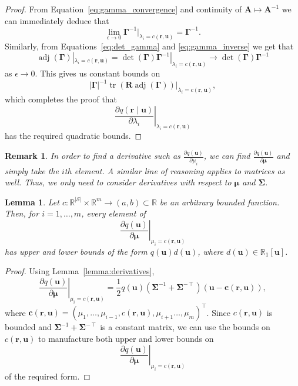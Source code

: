 \documentclass{mpaper}
\newtheorem{lemma}[theorem]{Lemma}
\newtheorem{remark}[theorem]{Remark}
\DeclareMathOperator{\adj}{adj}
\DeclareMathOperator{\tr}{tr}
\begin{document}
\begin{proof}
  From Equation~\eqref{eq:gamma_convergence} and continuity of $\mathbf{A} \mapsto
  \mathbf{A}^{-1}$ we can immediately deduce that
  \begin{equation} \label{eq:gamma_inverse}
    \lim_{\epsilon \to 0} \bm\Gamma^{-1}|_{\lambda_i = c(\mathbf{r},
      \mathbf{u})} = \bm\Gamma^{-1}.
  \end{equation}
  Similarly, from Equations~\eqref{eq:det_gamma} and \eqref{eq:gamma_inverse} we
  get that
  \[
    \adj(\bm\Gamma)|_{\lambda_i = c(\mathbf{r}, \mathbf{u})} =
    \det(\bm\Gamma)\bm\Gamma^{-1}|_{\lambda_i = c(\mathbf{r}, \mathbf{u})} \to
    \det(\bm\Gamma)\bm\Gamma^{-1}
  \]
  as $\epsilon \to 0$. This gives us constant bounds on
  \[
    |\bm\Gamma|^{-1}\tr(\mathbf{R}\adj(\bm\Gamma))|_{\lambda_i = c(\mathbf{r},
      \mathbf{u})},
  \]
  which completes the proof that
  \[
    \left. \frac{\partial q(\mathbf{r} \mid \mathbf{u})}{\partial \lambda_i}
    \right|_{\lambda_i = c(\mathbf{r}, \mathbf{u})}
  \]
  has the required quadratic bounds.
\end{proof}

\begin{remark}
  In order to find a derivative such as $\frac{\partial q(\mathbf{u})}{\partial
    \mu_i}$, we can find $\frac{\partial q(\mathbf{u})}{\partial \bm\mu}$ and
  simply take the $i$th element. A similar line of reasoning applies to matrices
  as well. Thus, we only need to consider derivatives with respect to $\bm\mu$
  and $\bm\Sigma$.
\end{remark}

\begin{lemma} \label{lemma:bound2}
  Let $c \colon \mathbb{R}^{|\mathcal{S}|} \times \mathbb{R}^m \to (a, b) \subset
  \mathbb{R}$ be an arbitrary bounded function. Then, for $i = 1, \dots, m$,
  every element of
  \[
    \left. \frac{\partial q(\mathbf{u})}{\partial \bm\mu} \right|_{\mu_i =
      c(\mathbf{r}, \mathbf{u})}
  \]
  has upper and lower bounds of the form $q(\mathbf{u})d(\mathbf{u})$,
  where $d(\mathbf{u}) \in \mathbb{R}_1[\mathbf{u}]$.
\end{lemma}
\begin{proof}
  Using Lemma~\ref{lemma:derivatives},
  \[
    \left. \frac{\partial q(\mathbf{u})}{\partial \bm\mu} \right|_{\mu_i =
      c(\mathbf{r}, \mathbf{u})} = \frac{1}{2}q(\mathbf{u})(\bm\Sigma^{-1} +
    \bm\Sigma^{-\intercal})(\mathbf{u} - \mathbf{c}(\mathbf{r}, \mathbf{u})),
  \]
  where $\mathbf{c}(\mathbf{r}, \mathbf{u}) = (\mu_1, \dots, \mu_{i - 1},
  c(\mathbf{r}, \mathbf{u}), \mu_{i + 1} \dots, \mu_m)^\intercal$. Since
  $c(\mathbf{r}, \mathbf{u})$ is bounded and $\bm\Sigma^{-1} +
  \bm\Sigma^{-\intercal}$ is a constant matrix, we can use the bounds on
  $c(\mathbf{r}, \mathbf{u})$ to manufacture both upper and lower bounds on
  \[
     \left. \frac{\partial q(\mathbf{u})}{\partial \bm\mu} \right|_{\mu_i =
      c(\mathbf{r}, \mathbf{u})}
  \]
  of the required form.
\end{proof}
\end{document}
